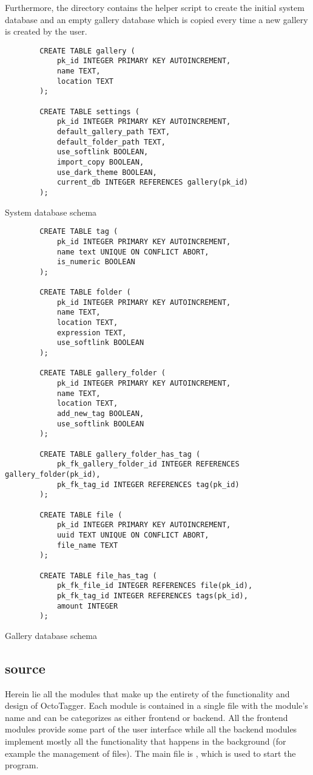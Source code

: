 Furthermore, the directory contains the helper script  to
create the initial system database and an empty gallery database which is
copied every time a new gallery is created by the user.

\begin{listing}[p]
	\begin{verbatim}
		CREATE TABLE gallery (
			pk_id INTEGER PRIMARY KEY AUTOINCREMENT,
			name TEXT,
			location TEXT
		);

		CREATE TABLE settings (
			pk_id INTEGER PRIMARY KEY AUTOINCREMENT,
			default_gallery_path TEXT,
			default_folder_path TEXT,
			use_softlink BOOLEAN,
			import_copy BOOLEAN,
			use_dark_theme BOOLEAN,
			current_db INTEGER REFERENCES gallery(pk_id)
		);
	\end{verbatim}
	\caption{System database schema}
	\label{lst:db:system}
\end{listing}

\begin{listing}[p]
	\begin{verbatim}
		CREATE TABLE tag (
			pk_id INTEGER PRIMARY KEY AUTOINCREMENT,
			name text UNIQUE ON CONFLICT ABORT,
			is_numeric BOOLEAN
		);

		CREATE TABLE folder (
			pk_id INTEGER PRIMARY KEY AUTOINCREMENT,
			name TEXT,
			location TEXT,
			expression TEXT,
			use_softlink BOOLEAN
		);

		CREATE TABLE gallery_folder (
			pk_id INTEGER PRIMARY KEY AUTOINCREMENT,
			name TEXT,
			location TEXT,
			add_new_tag BOOLEAN,
			use_softlink BOOLEAN
		);

		CREATE TABLE gallery_folder_has_tag (
			pk_fk_gallery_folder_id INTEGER REFERENCES gallery_folder(pk_id),
			pk_fk_tag_id INTEGER REFERENCES tag(pk_id)
		);

		CREATE TABLE file (
			pk_id INTEGER PRIMARY KEY AUTOINCREMENT,
			uuid TEXT UNIQUE ON CONFLICT ABORT,
			file_name TEXT
		);

		CREATE TABLE file_has_tag (
			pk_fk_file_id INTEGER REFERENCES file(pk_id),
			pk_fk_tag_id INTEGER REFERENCES tags(pk_id),
			amount INTEGER
		);
	\end{verbatim}
	\caption{Gallery database schema}
	\label{lst:db:gallery}
\end{listing}

\subsection{source}
Herein lie all the modules that make up the entirety of the functionality and
design of OctoTagger. Each module is contained in a single file with the
module's name and can be categorizes as either frontend or backend. All the
frontend modules provide some part of the user interface while all the backend
modules implement mostly all the functionality that happens in the background
(for example the management of files). The main file is , 
which is used to start the program.

